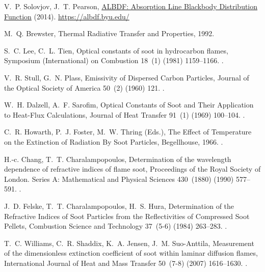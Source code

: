 \documentclass[preprint,12pt]{elsarticle}
\begin{document}
\begin{thebibliography}{10}
V.~P. Solovjov, J.~T. Pearson, \href{https://albdf.byu.edu/}{{ALBDF: Absorption
Line Blackbody Distribution Function}} (2014).
\newline\urlprefix\url{https://albdf.byu.edu/}

M.~Q. Brewster, {Thermal Radiative Transfer and Properties}, 1992.

S.~C. Lee, C.~L. Tien, {Optical constants of soot in hydrocarbon flames},
{Symposium (International) on Combustion} 18~(1) (1981) 1159--1166.
\newblock \href {http://dx.doi.org/10.1016/S0082-0784(81)80120-8}
  {}.

V.~R. Stull, G.~N. Plass, {Emissivity of Dispersed Carbon Particles}, {Journal
of the Optical Society of America} 50~(2) (1960) 121.
\newblock \href {http://dx.doi.org/10.1364/JOSA.50.000121}
  {}.

W.~H. Dalzell, A.~F. Sarofim, {Optical Constants of Soot and Their Application
to Heat-Flux Calculations}, {Journal of Heat Transfer} 91~(1) (1969)
100--104.
\newblock \href {http://dx.doi.org/10.1115/1.3580063}
  {}.

C.~R. Howarth, P.~J. Foster, M.~W. Thring (Eds.), {The Effect of Temperature on
the Extinction of Radiation By Soot Particles}, Begellhouse, 1966.
\newblock \href {http://dx.doi.org/10.1615/IHTC3.1210}
  {}.

H.-c. Chang, T.~T. Charalampopoulos, {Determination of the wavelength
dependence of refractive indices of flame soot}, {Proceedings of the Royal
Society of London. Series A: Mathematical and Physical Sciences} 430~(1880)
(1990) 577--591.
\newblock \href {http://dx.doi.org/10.1098/rspa.1990.0107}
  {}.

J.~D. Felske, T.~T. Charalampopoulos, H.~S. Hura, {Determination of the
Refractive Indices of Soot Particles from the Reflectivities of Compressed
Soot Pellets}, {Combustion Science and Technology} 37~(5-6) (1984) 263--283.
\newblock \href {http://dx.doi.org/10.1080/00102208408923757}
  {}.

T.~C. Williams, C.~R. Shaddix, K.~A. Jensen, J.~M. Suo-Anttila, {Measurement of
the dimensionless extinction coefficient of soot within laminar diffusion
flames}, {International Journal of Heat and Mass Transfer} 50~(7-8) (2007)
1616--1630.
\newblock \href {http://dx.doi.org/10.1016/j.ijheatmasstransfer.2006.08.024}
  {}.


\end{thebibliography}
\end{document}
